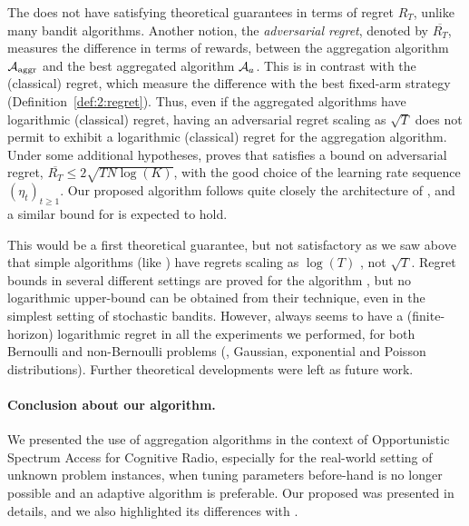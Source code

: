 The \Aggr{} does not have satisfying theoretical guarantees in terms of regret $R_T$, unlike many bandit algorithms.
%
Another notion, the \emph{adversarial regret}, denoted by $\overline{R_T}$,
measures the difference in terms of rewards,
between the aggregation algorithm $\mathcal{A}_{\mathrm{aggr}}$ and the best aggregated algorithm $\mathcal{A}_a$. This is in contrast with the (classical) regret, which measure the difference with the best fixed-arm strategy (Definition~\ref{def:2:regret}).
Thus, even if the aggregated algorithms have logarithmic (classical) regret, having an adversarial regret scaling as $\sqrt{T}$ does not permit to exhibit a logarithmic (classical) regret for the aggregation algorithm.
%
%
Under some additional hypotheses,
\cite[Theorem 4.2]{Bubeck12} proves that
\ExpQ{} satisfies a bound on adversarial regret, %
$\overline{R_T} \leq 2 \sqrt{T N \log(K)}$,
with the good choice of the learning rate sequence $(\eta_t)_{t \geq 1}$.
Our proposed algorithm follows quite closely the architecture of \ExpQ,
and a similar bound for \Aggr{} is expected to hold.
%

This would be a first theoretical guarantee, but not satisfactory as we saw above that simple algorithms (like \UCB) have regrets scaling as $\log(T)$ \cite{Auer02,Bubeck12}, not $\sqrt{T}$.
%
Regret bounds in several different settings are proved for the \CORRAL{} algorithm \cite{Agarwal16}, but no logarithmic upper-bound can be obtained from their technique, even in the simplest setting of stochastic bandits.
%
However, \Aggr{} always seems to have a (finite-horizon) logarithmic regret in all the experiments we performed,
for both Bernoulli and non-Bernoulli problems (\eg, Gaussian, exponential and Poisson distributions).
Further theoretical developments were left as future work.



\paragraph{Conclusion about our \Aggr{} algorithm.}\label{sub:25:conclusion}

We presented the use of aggregation algorithms in the context of Opportunistic Spectrum Access for Cognitive Radio,
especially for the real-world setting of unknown problem instances,
when tuning parameters before-hand is no longer possible and an adaptive algorithm is preferable.
Our proposed \Aggr{} was presented in details,
and we also highlighted its differences with \ExpQ.

